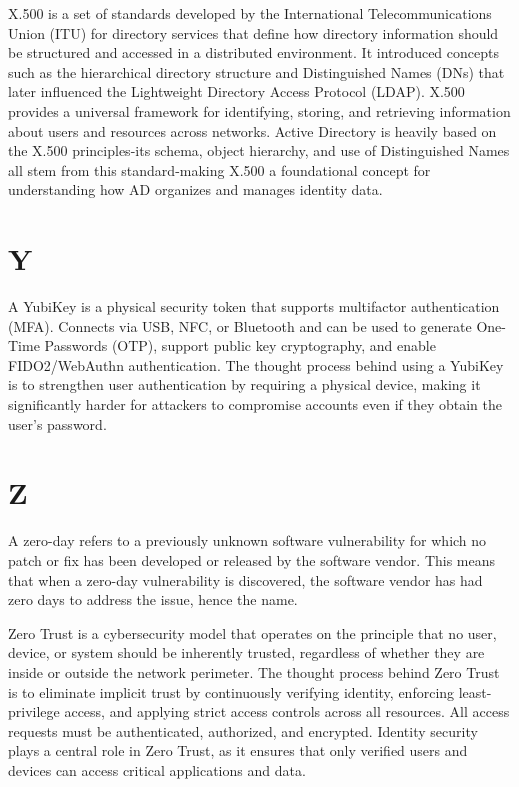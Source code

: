  X.500 is a set of standards developed by the International Telecommunications Union (ITU) for directory services that define how directory information should be structured and accessed in a distributed environment. It introduced concepts such as the hierarchical directory structure and Distinguished Names (DNs) that later influenced the Lightweight Directory Access Protocol (LDAP). X.500 provides a universal framework for identifying, storing, and retrieving information about users and resources across networks. Active Directory is heavily based on the X.500 principles-its schema, object hierarchy, and use of Distinguished Names all stem from this standard-making X.500 a foundational concept for understanding how AD organizes and manages identity data.

\section*{Y}
 A YubiKey is a physical security token that supports multifactor authentication (MFA). Connects via USB, NFC, or Bluetooth and can be used to generate One-Time Passwords (OTP), support public key cryptography, and enable FIDO2/WebAuthn authentication. The thought process behind using a YubiKey is to strengthen user authentication by requiring a physical device, making it significantly harder for attackers to compromise accounts even if they obtain the user's password.

\section*{Z}
 A zero-day refers to a previously unknown software vulnerability for which no patch or fix has been developed or released by the software vendor. This means that when a zero-day vulnerability is discovered, the software vendor has had zero days to address the issue, hence the name.

 Zero Trust is a cybersecurity model that operates on the principle that no user, device, or system should be inherently trusted, regardless of whether they are inside or outside the network perimeter. The thought process behind Zero Trust is to eliminate implicit trust by continuously verifying identity, enforcing least-privilege access, and applying strict access controls across all resources. All access requests must be authenticated, authorized, and encrypted. Identity security plays a central role in Zero Trust, as it ensures that only verified users and devices can access critical applications and data.

